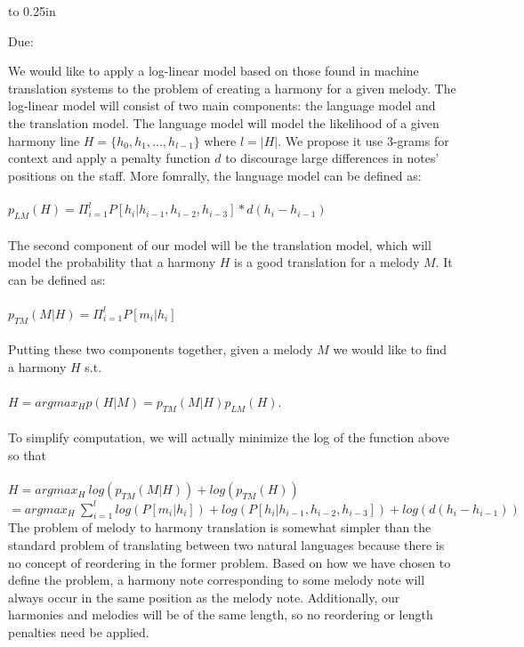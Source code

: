 \documentclass[letterpaper,12pt]{article}
\newcommand{\htitle}
{
    \vbox to 0.25in{}
    \noindent\parbox{\textwidth}
    {
        \student\hfill \assigndate\newline
        \coursename\hfill 
        Due: \duedate \vspace*{-.5ex}\newline
        \mbox{}\hrulefill\mbox{}
    }
    \vspace{8pt}
    \begin{center}{\Large\bf{\settitle}}\end{center}
}
\newcommand{\handout}
{
    \thispagestyle{empty}
    \markboth{}{}
    \pagestyle{plain}
    \htitle
}
\begin{document}
\handout
\setlength{\parindent}{0pt}

We would like to apply a log-linear model based on those found in machine translation systems to the problem of creating a harmony for a given melody. The log-linear model will consist of two main components: the language model and the translation model. The language model will model the likelihood of a  given harmony line $H = \{h_{0}, h_{1}, ... , h_{l - 1}\}$ where $l = |H|$. We propose it use 3-grams for context and apply a penalty function $d$ to discourage large differences in notes' positions on the staff. More fomrally, the language model can be defined as:\\
\\
$p_{LM}(H) = \Pi_{i = 1}^{l} P[h_{i} | h_{i - 1}, h_{i - 2}, h_{i - 3}]*d(h_{i} - h_{i - 1})$\\
\\
The second component of our model will be the translation model, which will model the probability that a harmony $H$ is a good translation for a melody $M$. It can be defined as:\\
\\
$p_{TM}(M | H) = \Pi_{i = 1}^{l} P[m_{i} | h_{i}]$\\
\\
Putting these two components together, given a melody $M$ we would like to find a harmony $H$ s.t.\\
\\
$H = argmax_{H}p(H | M) = p_{TM}(M | H)p_{LM}(H)$.\\
\\
To simplify computation, we will actually minimize the log of the function above so that\\
\\
$H = argmax_{H}\ log(p_{TM}(M | H)) + log(p_{TM}(H))$\\
$= argmax_{H}\ \sum_{i = 1}^{l} log(P[m_{i} | h_{i}]) + log(P[h_{i} | h_{i - 1}, h_{i - 2}, h_{i - 3}]) + log(d(h_{i} - h_{i - 1}))$
\\
The problem of melody to harmony translation is somewhat simpler than the standard problem of translating between two natural languages because there is no concept of reordering in the former problem. Based on how we have chosen to define the problem, a harmony note corresponding to some melody note will always occur in the same position as the melody note. Additionally, our harmonies and melodies will be of the same length, so no reordering or length penalties need be applied.

\vfill
\end{document}
